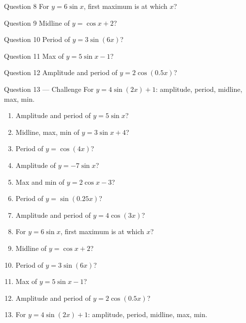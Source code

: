 \documentclass[11pt]{article}
\begin{document}
\begin{qbox}{Question 8}
For $y=6\sin x$, first maximum is at which $x$?\workspace{2.4cm}
\end{qbox}

\begin{qbox}{Question 9}
Midline of $y=\cos x+2$?\workspace{2.4cm}
\end{qbox}

\begin{qbox}{Question 10}
Period of $y=3\sin(6x)$?\workspace{2.4cm}
\end{qbox}

\begin{qbox}{Question 11}
Max of $y=5\sin x-1$?\workspace{2.4cm}
\end{qbox}

\begin{qbox}{Question 12}
Amplitude and period of $y=2\cos(0.5x)$?\workspace{2.4cm}
\end{qbox}

\begin{qbox}{Question 13 --- Challenge}
For $y=4\sin(2x)+1$: amplitude, period, midline, max, min.\workspace{3cm}
\end{qbox}

\clearpage
{}

\begin{recapbox}
\begin{multicols}{2}
\small
\begin{enumerate}[leftmargin=*,itemsep=3pt]
  \item Amplitude and period of $y=5\sin x$?
  \item Midline, max, min of $y=3\sin x+4$?
  \item Period of $y=\cos(4x)$?
  \item Amplitude of $y=-7\sin x$?
  \item Max and min of $y=2\cos x-3$?
  \item Period of $y=\sin(0.25x)$?
  \item Amplitude and period of $y=4\cos(3x)$?
  \item For $y=6\sin x$, first maximum is at which $x$?
  \item Midline of $y=\cos x+2$?
  \item Period of $y=3\sin(6x)$?
  \item Max of $y=5\sin x-1$?
  \item Amplitude and period of $y=2\cos(0.5x)$?
  \item For $y=4\sin(2x)+1$: amplitude, period, midline, max, min.
\end{enumerate}
\end{multicols}
\end{recapbox}
\end{document}
